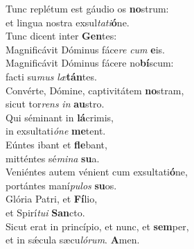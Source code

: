 \evenverse Tunc replétum est gáudio os \textbf{no}strum:~\*\\
\evenverse et lingua nostra exsul\textit{ta}\textit{ti}\textbf{ó}ne.\\
\oddverse Tunc dicent inter \textbf{Gen}tes:~\*\\
\oddverse Magnificávit Dóminus fáce\textit{re} \textit{cum} \textbf{e}is.\\
\evenverse Magnificávit Dóminus fácere no\textbf{bí}scum:~\*\\
\evenverse facti su\textit{mus} \textit{læ}\textbf{tán}tes.\\
\oddverse Convérte, Dómine, captivitátem \textbf{no}stram,~\*\\
\oddverse sicut tor\textit{rens} \textit{in} \textbf{au}stro.\\
\evenverse Qui séminant in \textbf{lá}crimis,~\*\\
\evenverse in exsultati\textit{ó}\textit{ne} \textbf{me}tent.\\
\oddverse Eúntes ibant et \textbf{fle}bant,~\*\\
\oddverse mitténtes sé\textit{mi}\textit{na} \textbf{su}a.\\
\evenverse Veniéntes autem vénient cum exsultati\textbf{ó}ne,~\*\\
\evenverse portántes maní\textit{pu}\textit{los} \textbf{su}os.\\
\oddverse Glória Patri, et \textbf{Fí}lio,~\*\\
\oddverse et Spirí\textit{tu}\textit{i} \textbf{San}cto.\\
\evenverse Sicut erat in princípio, et nunc, et \textbf{sem}per,~\*\\
\evenverse et in sǽcula sæcu\textit{ló}\textit{rum}. \textbf{A}men.\\
